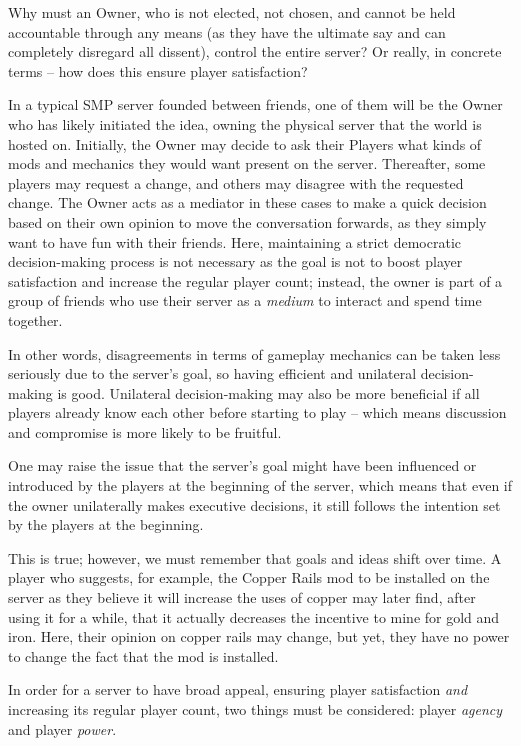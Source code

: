 Why must an Owner, who is not elected, not chosen, and cannot be held accountable through any means (as they have the ultimate say and can completely disregard all dissent), control the entire server? Or really, in concrete terms – how does this ensure player satisfaction?

In a typical SMP server founded between friends, one of them will be the Owner who has likely initiated the idea, owning the physical server that the world is hosted on. Initially, the Owner may decide to ask their Players what kinds of mods and mechanics they would want present on the server. Thereafter, some players may request a change, and others may disagree with the requested change. The Owner acts as a mediator in these cases to make a quick decision based on their own opinion to move the conversation forwards, as they simply want to have fun with their friends. Here, maintaining a strict democratic decision-making process is not necessary as the goal is not to boost player satisfaction and increase the regular player count; instead, the owner is part of a group of friends who use their server as a \emph{medium} to interact and spend time together.

In other words, disagreements in terms of gameplay mechanics can be taken less seriously due to the server’s goal, so having efficient and unilateral decision-making is good. Unilateral decision-making may also be more beneficial if all players already know each other before starting to play – which means discussion and compromise is more likely to be fruitful.

One may raise the issue that the server’s goal might have been influenced or introduced by the players at the beginning of the server, which means that even if the owner unilaterally makes executive decisions, it still follows the intention set by the players at the beginning.

This is true; however, we must remember that goals and ideas shift over time. A player who suggests, for example, the Copper Rails mod to be installed on the server as they believe it will increase the uses of copper may later find, after using it for a while, that it actually decreases the incentive to mine for gold and iron. Here, their opinion on copper rails may change, but yet, they have no power to change the fact that the mod is installed.

In order for a server to have broad appeal, ensuring player satisfaction \emph{and} increasing its regular player count, two things must be considered: player \emph{agency} and player \emph{power}.

